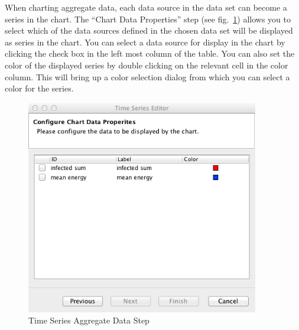 \documentclass[11pt]{amsart}
\begin{document}
When charting aggregate data, each  data source in the data set can become a series in the chart. The ``Chart Data Properties'' step (see fig.~\ref{fig:ts2}) allows you to select which of the data sources defined in the chosen data set will be displayed as series in the chart. You can select a data source for display in the chart by clicking the check box in the left most column of the table. You can also set the color of the displayed series by double clicking on the relevant cell in the color column. This will bring up a color selection dialog from which you can select a color for the series.

\begin{figure}[h]
\begin{center}
\vspace{.2in}
\centerline {
\includegraphics[width=4in]{images/ts2.png}
}
\caption{Time Series Aggregate Data Step}
\label{fig:ts2}
\end{center}
\end{figure}
\end{document}
